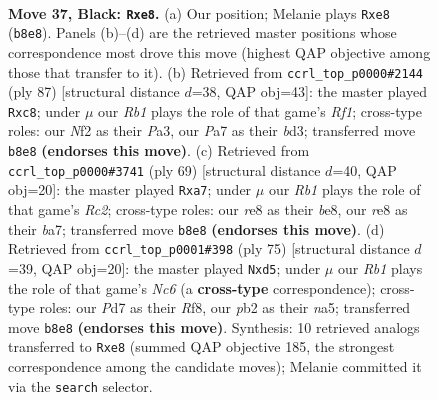 \documentclass[11pt]{article}
\begin{document}
\clearpage

\begin{figure}[p]\centering
\begin{subfigure}{0.46\textwidth}\centering
\resizebox{\linewidth}{!}{%
\newchessgame
\chessboard[
  setfen={1r2R3/pb1p1pk1/8/6P1/8/8/PPK2n2/2B2BR1 b - - 0 37},
  showmover=false,
  pgfstyle=straightmove, color=movearrow, markmove={b8-e8}
]}
\caption{}
\end{subfigure}\hfill
\begin{subfigure}{0.46\textwidth}\centering
\resizebox{\linewidth}{!}{%
\newchessgame
\chessboard[
  setfen={2R2r2/8/8/1P1pk3/5b2/p2B1P2/P3K3/1R6 b - - 0 44},
  showmover=false,
  pgfstyle=straightmove, color=movearrow, markmove={f8-c8}
]}
\caption{}
\end{subfigure}
\\[4pt]
\begin{subfigure}{0.46\textwidth}\centering
\resizebox{\linewidth}{!}{%
\newchessgame
\chessboard[
  setfen={1R2B3/B1r1bp1k/p3p2p/8/5P2/6K1/P6P/8 b - - 4 35},
  showmover=false,
  pgfstyle=straightmove, color=movearrow, markmove={c7-a7}
]}
\caption{}
\end{subfigure}\hfill
\begin{subfigure}{0.46\textwidth}\centering
\resizebox{\linewidth}{!}{%
\newchessgame
\chessboard[
  setfen={2b2r2/7k/p5pp/N1PBp3/8/2n5/6PP/4R1BK b - - 2 38},
  showmover=false,
  pgfstyle=straightmove, color=movearrow, markmove={c3-d5}
]}
\caption{}
\end{subfigure}
\caption{\textbf{Move 37, Black: \texttt{Rxe8}.} (a) Our position; Melanie plays \texttt{Rxe8} (\texttt{b8e8}). Panels (b)--(d) are the retrieved master positions whose correspondence most drove this move (highest QAP objective among those that transfer to it). (b) Retrieved from \texttt{ccrl\_top\_p0000\#2144} (ply 87) [structural distance $d$=38, QAP obj=43]: the master played \texttt{Rxc8}; under $\mu$ our \emph{Rb1} plays the role of that game's \emph{Rf1}; cross-type roles: our \emph{N}f2 as their \emph{P}a3, our \emph{P}a7 as their \emph{b}d3; transferred move \texttt{b8e8} \textbf{(endorses this move)}. (c) Retrieved from \texttt{ccrl\_top\_p0000\#3741} (ply 69) [structural distance $d$=40, QAP obj=20]: the master played \texttt{Rxa7}; under $\mu$ our \emph{Rb1} plays the role of that game's \emph{Rc2}; cross-type roles: our \emph{r}e8 as their \emph{b}e8, our \emph{r}e8 as their \emph{b}a7; transferred move \texttt{b8e8} \textbf{(endorses this move)}. (d) Retrieved from \texttt{ccrl\_top\_p0001\#398} (ply 75) [structural distance $d$=39, QAP obj=20]: the master played \texttt{Nxd5}; under $\mu$ our \emph{Rb1} plays the role of that game's \emph{Nc6} (a \textbf{cross-type} correspondence); cross-type roles: our \emph{P}d7 as their \emph{R}f8, our \emph{p}b2 as their \emph{n}a5; transferred move \texttt{b8e8} \textbf{(endorses this move)}. Synthesis: 10 retrieved analogs transferred to \texttt{Rxe8} (summed QAP objective 185, the strongest correspondence among the candidate moves); Melanie committed it via the \texttt{search} selector.}
\label{fig:thought-m73}
\end{figure}
\end{document}
